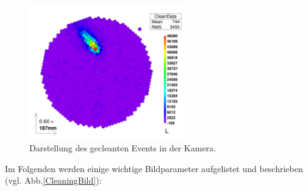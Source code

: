 \begin{figure}
    \centering
    \includegraphics[width=0.6\textwidth]{./Plots/Signal_gecleant_fertig.png}
    \caption{Darstellung des gecleanten Events in der Kamera.}
    \label{Kamera-Bild-gecleant}
\end{figure}


Im Folgenden werden einige wichtige Bildparameter aufgelistet und beschrieben (vgl. Abb.\ref{CleaningBild}):

